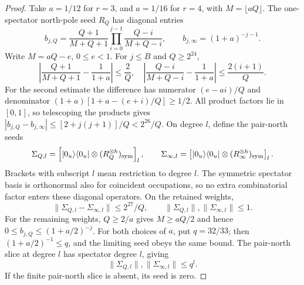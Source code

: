 \documentclass[11pt]{article}
\begin{document}
\begin{proof}
Take $a=1/12$ for $r=3$, and $a=1/16$ for $r=4$, with
$M=\lfloor aQ\rfloor$. The one-spectator north-pole seed $R_Q$ has
diagonal entries
\begin{equation}
 b_{j,Q}=\frac{Q+1}{M+Q+1}\prod_{i=0}^{j-1}\frac{Q-i}{M+Q-i},
 \qquad b_{j,\infty}=(1+a)^{-j-1}.
\end{equation}
Write $M=aQ-e$, $0\le e<1$. For $j\le B$ and $Q\ge2^{24}$,
\begin{equation}
 \left|\frac{Q+1}{M+Q+1}-\frac1{1+a}\right|\le\frac2Q,
 \quad
 \left|\frac{Q-i}{M+Q-i}-\frac1{1+a}\right|
 \le\frac{2(i+1)}Q.
\end{equation}
For the second estimate the difference has numerator $(e-ai)/Q$ and
denominator $(1+a)[1+a-(e+i)/Q]\ge1/2$.
All product factors lie in $[0,1]$, so telescoping the products gives
$|b_{j,Q}-b_{j,\infty}|\le[2+j(j+1)]/Q<2^{26}/Q$.
On degree $l$, define the pair-north seeds
\begin{equation}
 \Sigma_{Q,l}=\left[|0_u\rangle\langle0_u|
          \otimes(R_Q^{\otimes h})_{\rm sym}\right]_l,
 \qquad
 \Sigma_{\infty,l}=\left[|0_u\rangle\langle0_u|
          \otimes(R_\infty^{\otimes h})_{\rm sym}\right]_l.
\end{equation}
Brackets with subscript $l$ mean restriction to degree $l$.
The symmetric spectator basis is orthonormal also for coincident
occupations, so no extra combinatorial factor enters these diagonal
operators. On the retained weights,
\begin{equation}\label{eq:explicit-coh-seed-error}
 \|\Sigma_{Q,l}-\Sigma_{\infty,l}\|\le2^{27}/Q,
 \qquad \|\Sigma_{Q,l}\|,\|\Sigma_{\infty,l}\|\le1.
\end{equation}
For the remaining weights, $Q\ge2/a$ gives $M\ge aQ/2$ and hence
$0\le b_{j,Q}\le(1+a/2)^{-j}$. For both choices of $a$, put $q=32/33$;
then $(1+a/2)^{-1}\le q$, and the limiting seed obeys the same bound.
The pair-north slice at degree $l$ has spectator degree $l$, giving
\begin{equation}\label{eq:explicit-coh-seed-tail}
 \|\Sigma_{Q,l}\|,\|\Sigma_{\infty,l}\|\le q^l.
\end{equation}
If the finite pair-north slice is absent, its seed is zero.


\end{proof}
\end{document}
